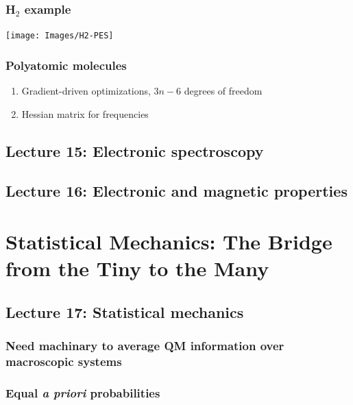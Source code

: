 \documentclass[11pt]{article}
\begin{document}
\subsubsection{H\(_2\) example}
\label{sec:org06f9bba}
\begin{center}
  \texttt{[image: Images/H2-PES]}
\end{center}
\subsubsection{Polyatomic molecules}
\label{sec:org381af59}
\begin{enumerate}
\item Gradient-driven optimizations, \(3n-6\) degrees of freedom
\item Hessian matrix for frequencies
\end{enumerate}

\subsection{Lecture 15: Electronic spectroscopy}
\label{sec:org667870d}
\subsection{Lecture 16: Electronic and magnetic properties}
\label{sec:org421555c}

\section{Statistical Mechanics: The Bridge from the Tiny to the Many}
\label{sec:orgcfdfc74}

\subsection{Lecture 17: Statistical mechanics}
\label{sec:org6a50f4b}
\subsubsection{Need machinary to average QM information over macroscopic systems}
\label{sec:org9ce57d8}
\subsubsection{Equal \emph{a priori} probabilities}
\label{sec:orgbadbd39}
\end{document}
